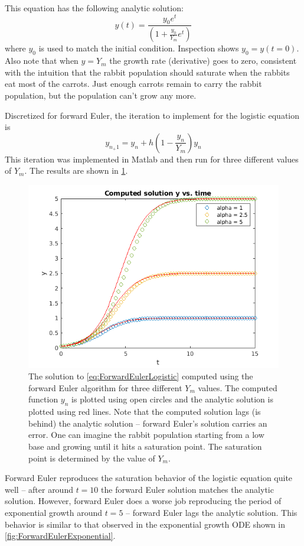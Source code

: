 \documentclass[hidelinks,notitlepage]{book}
\begin{document}
This equation has the following analytic solution:
\begin{equation}
\label{eq:AnalyticLogistic}
y(t) = \frac{y_0 e^t}{ \left( 1 + \frac{y_0}{Y_m} e^t \right) }
\end{equation}
where $y_0$ is used to match the initial condition.  Inspection shows $y_0 = y(t=0)$.  Also note that when $y = Y_m$ the growth rate (derivative) goes to zero, consistent with the intuition that the rabbit population should saturate when the rabbits eat most of the carrots.  Just enough carrots remain to carry the rabbit population, but the population can't grow any more.

Discretized for forward Euler, the iteration to implement for the logistic equation is 
\begin{equation}
y_{n_+1} = y_n + h \left( 1 - \frac{y_n}{Y_m} \right) y_n
\end{equation}
This iteration was implemented in Matlab and then run for three different values of $Y_m$. The results are shown in \cref{fig:ForwardEulerLogistic}.
\begin{figure}[tbh]
	\centering
	\includegraphics[width=0.7\columnwidth]{ForwardEulerLogistic.png}
	\caption{The solution to \cref{eq:ForwardEulerLogistic} computed using the forward Euler algorithm for three different $Y_m$ values.  The computed function $y_n$ is plotted using open circles and the analytic solution is plotted using red lines.  Note that the computed solution lags (is behind) the analytic solution -- forward Euler's solution carries an error.  One can imagine the rabbit population starting from a low base and growing until it hits a saturation point.  The saturation point is determined by the value of $Y_m$.}
	\label{fig:ForwardEulerLogistic}
\end{figure}
Forward Euler reproduces the saturation behavior of the logistic equation quite well -- after around $t = 10$ the forward Euler solution matches the analytic solution.  However, forward Euler does a worse job reproducing the period of exponential growth around $t = 5$ -- forward Euler lags the analytic solution.  This behavior is similar to that observed in the exponential growth ODE shown in \cref{fig:ForwardEulerExponential}.
\end{document}

